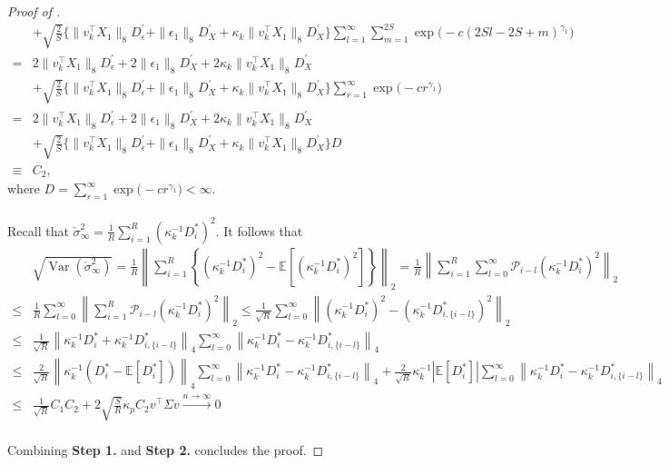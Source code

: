 \documentclass[11pt]{article}
\DeclareMathOperator*{\var}{Var}
\theoremstyle{plain}
\theoremstyle{definition}
\begin{document}
\begin{proof}[Proof of ]
\begin{align}
        &+ \sqrt{\frac{2}{S}}\big\{\|v_k^{\top}X_1\|_{8}D_{\epsilon}^{\prime} + \|\epsilon_1\|_{8}D_X^{\prime} + \kappa_k\|v_k^{\top}X_1\|_{8}D_X^{\prime}\big\}\sum_{l = 1}^{\infty}\sum_{m = 1}^{2S}\exp\big(-c(2Sl-2S+m)^{\gamma_1}\big) \nonumber\\
        =& 2\|v_k^{\top}X_1\|_{8}D_{\epsilon}^{\prime} + 2\|\epsilon_1\|_{8}D_{X}^{\prime} + 2\kappa_k\|v^{\top}_kX_1\|_{8}D_X^{\prime} \nonumber\\
        &+ \sqrt{\frac{2}{S}}\big\{\|v_k^{\top}X_1\|_{8}D_{\epsilon}^{\prime} + \|\epsilon_1\|_{8}D_X^{\prime} + \kappa_k\|v_k^{\top}X_1\|_{8}D_X^{\prime}\big\}\sum_{r = 1}^{\infty}\exp\big(-cr^{\gamma_1}\big) \nonumber\\
        =& 2\|v_k^{\top}X_1\|_{8}D_{\epsilon}^{\prime} + 2\|\epsilon_1\|_{8}D_{X}^{\prime} + 2\kappa_k\|v^{\top}_kX_1\|_{8}D_X^{\prime} \nonumber\\
        &+ \sqrt{\frac{2}{S}}\big\{\|v_k^{\top}X_1\|_{8}D_{\epsilon}^{\prime} + \|\epsilon_1\|_{8}D_X^{\prime} + \kappa_k\|v_k^{\top}X_1\|_{8}D_X^{\prime}\big\}D \nonumber\\
        \equiv& C_2,
    \end{align}
    where $D = \sum_{r = 1}^{\infty}\exp\big(-cr^{\gamma_1}\big) < \infty$.
    \\
    \\
    Recall that
    $\check{\sigma}_{\infty}^2 = \frac{1}{R}\sum_{i = 1}^R(\kappa_k^{-1}D_i^*)^2$.
    It follows that
    \begin{align*}
        &\sqrt{\var(\check{\sigma}_{\infty}^2)} = \frac{1}{R}\left\|\sum_{i = 1}^R\left\{(\kappa_k^{-1}D_i^*)^2 - \mathbb{E}[(\kappa_k^{-1}D_i^*)^2]\right\}\right\|_2 = \frac{1}{R}\left\|\sum_{i = 1}^R\sum_{l = 0}^{\infty}\mathcal{P}_{i-l}(\kappa_k^{-1}D_i^*)^2\right\|_2\\
        \leq& \frac{1}{R}\sum_{l = 0}^{\infty}\left\|\sum_{i = 1}^R\mathcal{P}_{i-l}(\kappa_k^{-1}D_i^*)^2\right\|_2 \leq \frac{1}{\sqrt{R}}\sum_{l = 0}^{\infty}\left\|(\kappa_k^{-1}D_i^*)^2 - (\kappa_k^{-1}D_{i, \{i-l\}}^*)^2\right\|_2\\
        \leq& \frac{1}{\sqrt{R}}\left\|\kappa_k^{-1}D_i^* + \kappa_k^{-1}D_{i, \{i-l\}}^*\right\|_4\sum_{l = 0}^{\infty}\left\|\kappa_k^{-1}D_i^* - \kappa_k^{-1}D_{i, \{i-l\}}^*\right\|_4\\
        \leq& \frac{2}{\sqrt{R}}\left\|\kappa_k^{-1}(D_i^* - \mathbb{E}[D_i^*])\right\|_4\sum_{l = 0}^{\infty}\left\|\kappa_k^{-1}D_i^* - \kappa_k^{-1}D_{i, \{i-l\}}^*\right\|_4 + \frac{2}{\sqrt{R}}\kappa_k^{-1}|\mathbb{E}[D_i^*]|\sum_{l = 0}^{\infty}\left\|\kappa_k^{-1}D_i^* - \kappa_k^{-1}D_{i, \{i-l\}}^*\right\|_4\\
        \leq& \frac{1}{\sqrt{R}}C_1C_2 + 2\sqrt{\frac{S}{R}}\kappa_pC_2v^{\top}\Sigma v \overset{n \to \infty}{\longrightarrow} 0
    \end{align*}
    \\
    Combining {\bf Step 1.} and {\bf Step 2.} concludes the proof.
\end{proof}
\end{document}
